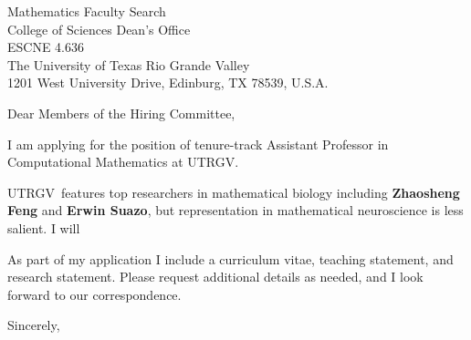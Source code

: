 \documentclass[11pt,a4paper]{letter}
\begin{document}

\def\School{UTRGV}

\begin{letter}
{Mathematics Faculty Search\\
College of Sciences Dean’s Office\\
ESCNE 4.636\\
The University of Texas Rio Grande Valley\\
1201 West University Drive, Edinburg, TX 78539, U.S.A.
}


\opening{Dear Members of the Hiring Committee,}

I am applying for the position of tenure-track Assistant Professor in Computational Mathematics at \School. 



\School~features top researchers in mathematical biology including \textbf{Zhaosheng Feng} and \textbf{Erwin Suazo}, but representation in mathematical neuroscience is less salient. I will 



As part of my application I include a curriculum vitae, teaching statement, and research statement. Please request additional details as needed, and I look forward to our correspondence.

\closing{Sincerely,}
\end{letter}
\end{document}
